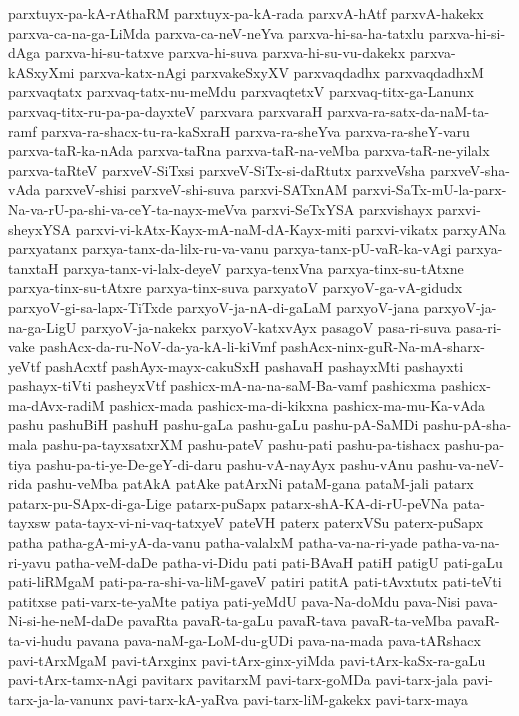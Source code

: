 {parxtuyx-pa-kA-rAthaRM
parxtuyx-pa-kA-rada
parxvA-hAtf
parxvA-hakekx
parxva-ca-na-ga-LiMda
parxva-ca-neV-neYva
parxva-hi-sa-ha-tatxlu
parxva-hi-si-dAga
parxva-hi-su-tatxve
parxva-hi-suva
parxva-hi-su-vu-dakekx
parxva-kASxyXmi
parxva-katx-nAgi
parxvakeSxyXV
parxvaqdadhx
parxvaqdadhxM
parxvaqtatx
parxvaq-tatx-nu-meMdu
parxvaqtetxV
parxvaq-titx-ga-Lanunx
parxvaq-titx-ru-pa-pa-dayxteV
parxvara
parxvaraH
parxva-ra-satx-da-naM-ta-ramf
parxva-ra-shacx-tu-ra-kaSxraH
parxva-ra-sheYva
parxva-ra-sheY-varu
parxva-taR-ka-nAda
parxva-taRna
parxva-taR-na-veMba
parxva-taR-ne-yilalx
parxva-taRteV
parxveV-SiTxsi
parxveV-SiTx-si-daRtutx
parxveVsha
parxveV-sha-vAda
parxveV-shisi
parxveV-shi-suva
parxvi-SATxnAM
parxvi-SaTx-mU-la-parx-Na-va-rU-pa-shi-va-ceY-ta-nayx-meVva
parxvi-SeTxYSA
parxvishayx
parxvi-sheyxYSA
parxvi-vi-kAtx-Kayx-mA-naM-dA-Kayx-miti
parxvi-vikatx
parxyANa
parxyatanx
parxya-tanx-da-lilx-ru-va-vanu
parxya-tanx-pU-vaR-ka-vAgi
parxya-tanxtaH
parxya-tanx-vi-lalx-deyeV
parxya-tenxVna
parxya-tinx-su-tAtxne
parxya-tinx-su-tAtxre
parxya-tinx-suva
parxyatoV
parxyoV-ga-vA-gidudx
parxyoV-gi-sa-lapx-TiTxde
parxyoV-ja-nA-di-gaLaM
parxyoV-jana
parxyoV-ja-na-ga-LigU
parxyoV-ja-nakekx
parxyoV-katxvAyx
pasagoV
pasa-ri-suva
pasa-ri-vake
pashAcx-da-ru-NoV-da-ya-kA-li-kiVmf
pashAcx-ninx-guR-Na-mA-sharx-yeVtf
pashAcxtf
pashAyx-mayx-cakuSxH
pashavaH
pashayxMti
pashayxti
pashayx-tiVti
pasheyxVtf
pashicx-mA-na-na-saM-Ba-vamf
pashicxma
pashicx-ma-dAvx-radiM
pashicx-mada
pashicx-ma-di-kikxna
pashicx-ma-mu-Ka-vAda
pashu
pashuBiH
pashuH
pashu-gaLa
pashu-gaLu
pashu-pA-SaMDi
pashu-pA-sha-mala
pashu-pa-tayxsatxrXM
pashu-pateV
pashu-pati
pashu-pa-tishacx
pashu-pa-tiya
pashu-pa-ti-ye-De-geY-di-daru
pashu-vA-nayAyx
pashu-vAnu
pashu-va-neV-rida
pashu-veMba
patAkA
patAke
patArxNi
pataM-gana
pataM-jali
patarx
patarx-pu-SApx-di-ga-Lige
patarx-puSapx
patarx-shA-KA-di-rU-peVNa
pata-tayxsw
pata-tayx-vi-ni-vaq-tatxyeV
pateVH
paterx
paterxVSu
paterx-puSapx
patha
patha-gA-mi-yA-da-vanu
patha-valalxM
patha-va-na-ri-yade
patha-va-na-ri-yavu
patha-veM-daDe
patha-vi-Didu
pati
pati-BAvaH
patiH
patigU
pati-gaLu
pati-liRMgaM
pati-pa-ra-shi-va-liM-gaveV
patiri
patitA
pati-tAvxtutx
pati-teVti
patitxse
pati-varx-te-yaMte
patiya
pati-yeMdU
pava-Na-doMdu
pava-Nisi
pava-Ni-si-he-neM-daDe
pavaRta
pavaR-ta-gaLu
pavaR-tava
pavaR-ta-veMba
pavaR-ta-vi-hudu
pavana
pava-naM-ga-LoM-du-gUDi
pava-na-mada
pava-tARshacx
pavi-tArxMgaM
pavi-tArxginx
pavi-tArx-ginx-yiMda
pavi-tArx-kaSx-ra-gaLu
pavi-tArx-tamx-nAgi
pavitarx
pavitarxM
pavi-tarx-goMDa
pavi-tarx-jala
pavi-tarx-ja-la-vanunx
pavi-tarx-kA-yaRva
pavi-tarx-liM-gakekx
pavi-tarx-maya
}
